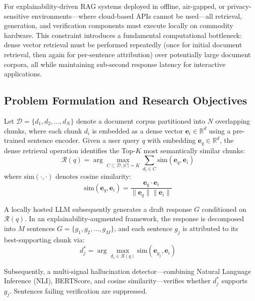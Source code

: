 \documentclass[conference]{IEEEtran}
\begin{document}
For explainability-driven RAG systems deployed in offline, air-gapped, or privacy-sensitive environments—where cloud-based APIs cannot be used—all retrieval, generation, and verification components must execute locally on commodity hardware. This constraint introduces a fundamental computational bottleneck: dense vector retrieval must be performed repeatedly (once for initial document retrieval, then again for per-sentence attribution) over potentially large document corpora, all while maintaining sub-second response latency for interactive applications.

\subsection{Problem Formulation and Research Objectives}

Let $\mathcal{D} = \{d_1, d_2, \ldots, d_N\}$ denote a document corpus partitioned into $N$ overlapping chunks, where each chunk $d_i$ is embedded as a dense vector $\mathbf{e}_i \in \mathbb{R}^d$ using a pre-trained sentence encoder. Given a user query $q$ with embedding $\mathbf{e}_q \in \mathbb{R}^d$, the dense retrieval operation identifies the Top-$K$ most semantically similar chunks:
\begin{equation}
\mathcal{R}(q) = \arg\max_{C \subset \mathcal{D}, |C|=K} \sum_{d_i \in C} \text{sim}(\mathbf{e}_q, \mathbf{e}_i)
\end{equation}
where $\text{sim}(\cdot,\cdot)$ denotes cosine similarity:
\begin{equation}
\text{sim}(\mathbf{e}_q, \mathbf{e}_i) = \frac{\mathbf{e}_q \cdot \mathbf{e}_i}{\|\mathbf{e}_q\| \|\mathbf{e}_i\|}
\end{equation}

A locally hosted LLM subsequently generates a draft response $G$ conditioned on $\mathcal{R}(q)$. In an explainability-augmented framework, the response is decomposed into $M$ sentences $G = \{g_1, g_2, \ldots, g_M\}$, and each sentence $g_j$ is attributed to its best-supporting chunk via:
\begin{equation}
d^*_j = \arg\max_{d_i \in \mathcal{R}(q)} \text{sim}(\mathbf{e}_{g_j}, \mathbf{e}_i)
\end{equation}

Subsequently, a multi-signal hallucination detector—combining Natural Language Inference (NLI), BERTScore, and cosine similarity—verifies whether $d^*_j$ supports $g_j$. Sentences failing verification are suppressed.
\end{document}
